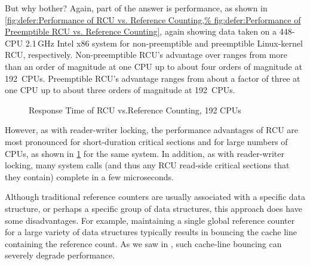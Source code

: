 But why bother?
Again, part of the answer is performance, as shown in
\cref{fig:defer:Performance of RCU vs. Reference Counting,%
fig:defer:Performance of Preemptible RCU vs. Reference Counting},
again showing data taken on a 448-CPU 2.1\,GHz Intel x86 system
for non-preemptible and preemptible Linux-kernel RCU, respectively.
Non-preemptible RCU's advantage over
 ranges from
more than an order of magnitude at one CPU up to about four orders of
magnitude at 192~CPUs.
Preemptible RCU's advantage ranges from about a factor of three at
one CPU up to about three orders of magnitude at 192~CPUs.

\begin{figure}
\centering
{}
\caption{Response Time of RCU vs.\@ Reference Counting, 192 CPUs}
\label{fig:defer:Response Time of RCU vs. Reference Counting}
\end{figure}

However, as with reader-writer locking, the performance advantages of
RCU are most pronounced for short-duration critical sections and for
large numbers of CPUs, as shown in
\cref{fig:defer:Response Time of RCU vs. Reference Counting}
for the same system.
In addition, as with reader-writer locking, many system calls (and thus
any RCU read-side critical sections that they contain) complete in
a few microseconds.

Although traditional reference counters are usually associated with a
specific data structure, or perhaps a specific group of data structures,
this approach does have some disadvantages.
For example, maintaining a single global reference counter for a large
variety of data structures typically results in bouncing the cache line
containing the reference count.
As we saw in
,
such cache-line bouncing can severely degrade performance.

